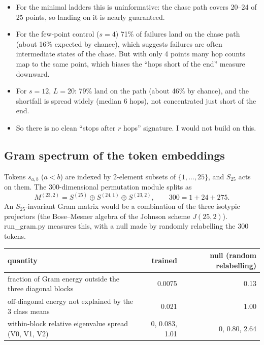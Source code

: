 \documentclass[paper=a4,fontsize=11pt,DIV=11,parskip=half,headings=small,numbers=noendperiod]{scrartcl}
\DeclareRobustCommand{\code}[1]{{\fontseries{m}\ttfamily #1}}
\DeclareRobustCommand{\hdr}[1]{\textsf{\bfseries #1}}
\begin{document}
\begin{itemize}
\item For the minimal ladders this is uninformative: the chase path covers 20–24 of 25 points, so landing on it
  is nearly guaranteed.
\item For the few-point control ($s=4$) 71\% of failures land on the chase path (about 16\% expected by chance),
  which suggests failures are often intermediate states of the chase. But with only 4 points many hop counts map
  to the same point, which biases the “hops short of the end” measure downward.
\item For $s=12$, $L=20$: 79\% land on the path (about 46\% by chance), and the shortfall is spread widely
  (median 6 hops), not concentrated just short of the end.
\item So there is no clean “stops after $r$ hops” signature. I would not build on this.
\end{itemize}

\subsection{Gram spectrum of the token embeddings}\label{sec:3.5}
Tokens $s_{a,b}$ ($a<b$) are indexed by 2-element subsets of $\{1,\dots,25\}$, and $S_{25}$ acts on them. The
300-dimensional permutation module splits as
\[ M^{(23,2)}=S^{(25)}\oplus S^{(24,1)}\oplus S^{(23,2)},\qquad 300=1+24+275. \]
An $S_{25}$-invariant Gram matrix would be a combination of the three isotypic projectors (the Bose–Mesner
algebra of the Johnson scheme $J(25,2)$). \code{run\_\allowbreak{}gram.\allowbreak{}py} measures this, with a
null made by randomly relabelling the 300 tokens.

\begin{center}\small
\begin{tabular}{@{}>{\raggedright\arraybackslash}p{6.6cm} r r@{}}
\toprule
\hdr{quantity} & \hdr{trained} & \hdr{null (random relabelling)} \\
\midrule
fraction of Gram energy outside the three diagonal blocks & 0.0075 & 0.13 \\
off-diagonal energy not explained by the 3 class means & 0.021 & 1.00 \\
within-block relative eigenvalue spread (V0, V1, V2) & 0, 0.083, 1.01 & 0, 0.80, 2.64 \\
\bottomrule
\end{tabular}
\end{center}
\end{document}
